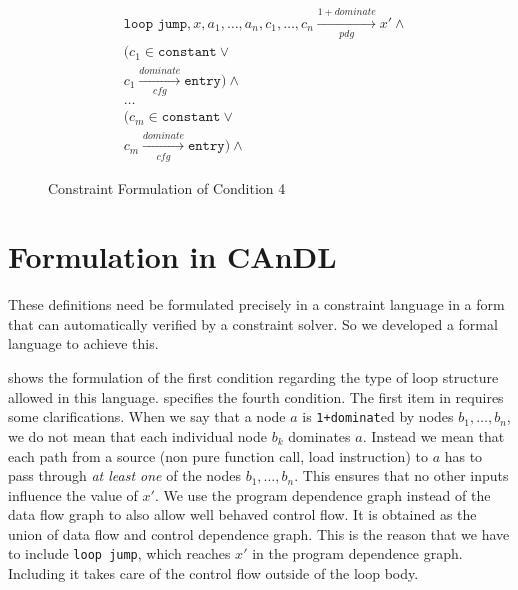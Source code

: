 \begin{figure}[ht]
\begin{align*}
&\texttt{loop jump},x,a_1,\dots,a_n,c_1,\dots,c_n\xrightarrow[pdg]{1+dominate}x'\mathrel{\land}\\
&(c_1\in\texttt{constant}\mathrel{\lor}\\
&c_1\xrightarrow[cfg]{dominate}\texttt{entry})\mathrel{\land}\\
&\dots\\
&(c_m\in\texttt{constant}\mathrel{\lor}\\
&c_m\xrightarrow[cfg]{dominate}\texttt{entry})\mathrel{\land}
\end{align*}
\caption{Constraint Formulation of Condition 4}
\label{dom-expr-constraints}
\end{figure}

\section{Formulation in CAnDL}

These definitions need be formulated precisely in a constraint language in a form that can 
automatically verified by a constraint solver.
So we  developed a
formal language  to achieve this.

 shows
the formulation of the first condition regarding the type of loop structure allowed in this language.  
 specifies the fourth condition.
The first item in   requires some clarifications.
When we say that a node $a$ is {\tt 1+dominat}ed by nodes $b_1,\dots,b_n$, we do not mean that each individual node $b_k$ dominates $a$.
Instead we mean that each path from a source (non pure function call, load instruction) to $a$ has to pass through {\em at least one} of the nodes $b_1,\dots,b_n$.
This ensures that no other inputs influence the value of $x'$.
We use the program dependence graph instead of the data flow graph to also allow well behaved control flow.
It is obtained as the union of data flow and control dependence graph.
This is the reason that we have to include \texttt{loop jump}, which reaches $x'$ in the program dependence graph.
Including it takes care of the control flow outside of the loop body.

